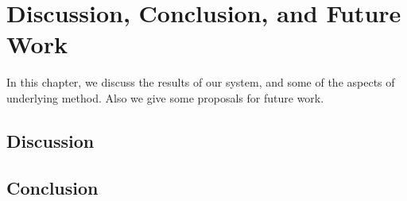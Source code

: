 
\chapter{Discussion, Conclusion, and Future Work}
\label{chap:conclusions}

In this chapter, we discuss the results of our system, and some of the aspects of underlying method. Also we give some proposals for future work.


\section{Discussion}


\section{Conclusion}



